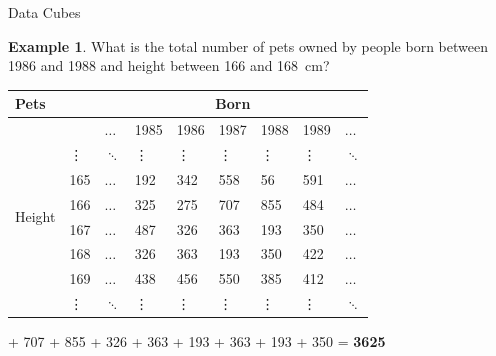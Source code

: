\documentclass{beamer}
\theoremstyle{definition}
\newtheorem{myexample}{Example}
\theoremstyle{definition}
\newcommand{\graycell}{\cellcolor[gray]{0.8}}
\begin{document}
\begin{frame}{Data Cubes}
    \begin{myexample}
        What is the total number of pets owned by people born between 1986 and 1988 and height between 166 and 168~cm?
    \end{myexample}

    \begin{table}[h]\footnotesize
        \begin{tabular} { | l | l | l | l | l | l | l | l | l |}
        \hline
        \textbf{Pets} & & \multicolumn{7}{|c|}{Born} \\ \hline
        & & $\hdots$ & 1985 & 1986 & 1987 & 1988 & 1989 & $\hdots$ \\ \hline
        \multirow{6}{*}{Height}
        & \vdots & $\ddots$ & \vdots & \vdots & \vdots & \vdots & \vdots & $\ddots$ \\
        & 165 & $\hdots$ & 192 & 342 & 558 & 56 & 591 & $\hdots$ \\
        & 166 & $\hdots$ & 325 & \graycell 275 & \graycell 707 & \graycell 855 & 484 & $\hdots$ \\
        & 167 & $\hdots$ & 487 & \graycell 326 & \graycell 363 & \graycell 193 & 350 & $\hdots$ \\
        & 168 & $\hdots$ & 326 & \graycell 363 & \graycell 193 & \graycell 350 & 422 & $\hdots$ \\
        & 169 & $\hdots$ & 438 & 456 & 550 & 385 & 412 & $\hdots$ \\
        & \vdots & $\ddots$ & \vdots & \vdots & \vdots & \vdots & \vdots & $\ddots$ \\
        \hline
        \end{tabular}
    \end{table}
     + 707 + 855 + 326 + 363 + 193 + 363 + 193 + 350 = \textbf{3625}
\end{frame}
\end{document}
